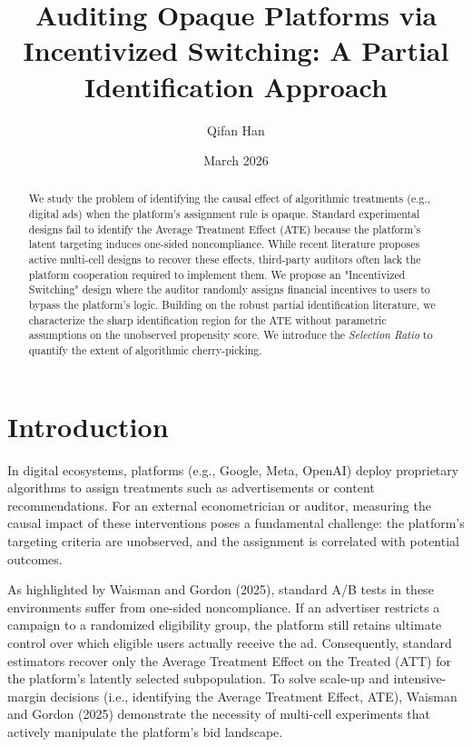\documentclass[11pt]{article}
\title{Auditing Opaque Platforms via Incentivized Switching: A Partial Identification Approach}
\author{Qifan Han}
\date{March 2026}
\begin{document}
\maketitle

\begin{abstract}
We study the problem of identifying the causal effect of algorithmic treatments (e.g., digital ads) when the platform's assignment rule is opaque. Standard experimental designs fail to identify the Average Treatment Effect (ATE) because the platform's latent targeting induces one-sided noncompliance. While recent literature proposes active multi-cell designs to recover these effects, third-party auditors often lack the platform cooperation required to implement them. We propose an "Incentivized Switching" design where the auditor randomly assigns financial incentives to users to bypass the platform's logic. Building on the robust partial identification literature, we characterize the sharp identification region for the ATE without parametric assumptions on the unobserved propensity score. We introduce the \textit{Selection Ratio} to quantify the extent of algorithmic cherry-picking.
\end{abstract}

\section{Introduction}
In digital ecosystems, platforms (e.g., Google, Meta, OpenAI) deploy proprietary algorithms to assign treatments such as advertisements or content recommendations. For an external econometrician or auditor, measuring the causal impact of these interventions poses a fundamental challenge: the platform's targeting criteria are unobserved, and the assignment is correlated with potential outcomes.

As highlighted by Waisman and Gordon (2025), standard A/B tests in these environments suffer from one-sided noncompliance. If an advertiser restricts a campaign to a randomized eligibility group, the platform still retains ultimate control over which eligible users actually receive the ad. Consequently, standard estimators recover only the Average Treatment Effect on the Treated (ATT) for the platform's latently selected subpopulation. To solve scale-up and intensive-margin decisions (i.e., identifying the Average Treatment Effect, ATE), Waisman and Gordon (2025) demonstrate the necessity of multi-cell experiments that actively manipulate the platform's bid landscape. 
\end{document}
